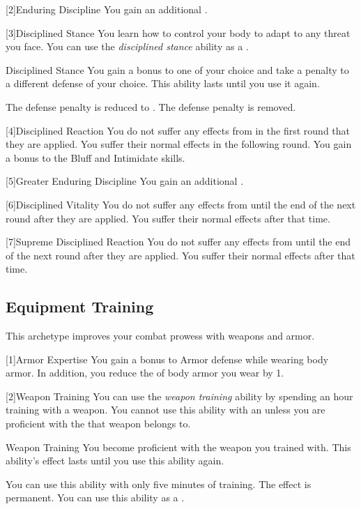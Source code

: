         [2]{Enduring Discipline}
        You gain an additional .

        [3]{Disciplined Stance}
        You learn how to control your body to adapt to any threat you face.
        You can use the \textit{disciplined stance} ability as a .
        \begin{freeability}{Disciplined Stance}
            You gain a  bonus to one  of your choice and take a  penalty to a different defense of your choice.
            This ability lasts until you use it again.

            \rankline
             The defense penalty is reduced to .
             The defense penalty is removed.
        \end{freeability}

        [4]{Disciplined Reaction}
        You do not suffer any effects from  in the first round that they are applied.
        You suffer their normal effects in the following round.
        You gain a  bonus to the Bluff and Intimidate skills.

        [5]{Greater Enduring Discipline}
        You gain an additional .

        [6]{Disciplined Vitality}
        You do not suffer any effects from  until the end of the next round after they are applied.
        You suffer their normal effects after that time.

        [7]{Supreme Disciplined Reaction}
        You do not suffer any effects from  until the end of the next round after they are applied.
        You suffer their normal effects after that time.

    \subsection{Equipment Training}
        This archetype improves your combat prowess with weapons and armor.

        [1]{Armor Expertise}
        You gain a  bonus to Armor defense while wearing body armor.
        In addition, you reduce the  of body armor you wear by 1.

        [2]{Weapon Training} You can use the \textit{weapon training} ability by spending an hour training with a weapon.
        You cannot use this ability with an  unless you are proficient with the  that weapon belongs to.
        \begin{freeability}{Weapon Training}
            You become proficient with the weapon you trained with.
            This ability's effect lasts until you use this ability again.

            \rankline
             You can use this ability with only five minutes of training.
             The effect is permanent.
             You can use this ability as a .
        \end{freeability}

